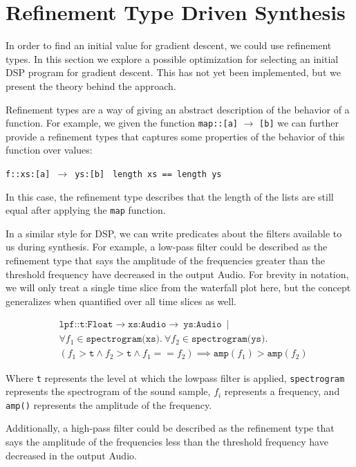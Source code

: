 \section{Refinement Type Driven Synthesis}
\label{sec:rtypes}

In order to find an initial value for gradient descent, we could use refinement types.
In this section we explore a possible optimization for selecting an initial DSP program for gradient descent.
This has not yet been implemented, but we present the theory behind the approach.

Refinement types are a way of giving an abstract description of the behavior of a function. 
For example, we given the function 
%
\texttt{map::[a]} $\to$ \texttt{[b]}
%
we can further provide a refinement types that captures some properties of the behavior of this function over values:

\texttt{f::xs:[a]} $\,\to\,$ \texttt{ys:[b]} \textbar \texttt{ length xs == length ys}

\noindent In this case, the refinement type describes that the length of the lists are still equal after applying the \texttt{map} function.

In a similar style for DSP, we can write predicates about the filters available to us during synthesis. 
For example, a low-pass filter could be described as the refinement type that says the amplitude of the frequencies greater than the threshold frequency have decreased in the output Audio.
For brevity in notation, we will only treat a single time slice from the waterfall plot here, but the concept generalizes when quantified over all time slices as well.

\begin{align*}
  &\texttt{lpf::t:Float} \to  \texttt{xs:Audio} \to\ \texttt{ys:Audio}\ \mid \\
  &\forall f_1 \in  \texttt{spectrogram(xs)}.\ \forall f_2 \in \texttt{spectrogram(ys)}. \\
  &(f_1 > \texttt{t}  \land  f_2 > \texttt{t}  \land f_1 == f_2) \implies \texttt{amp}(f_1) > \texttt{amp}(f_2)
\end{align*}

Where \texttt{t} represents the level at which the lowpass filter is applied, \texttt{spectrogram} represents the spectrogram of the sound sample, $f_i$ represents a frequency, and \texttt{amp()} represents the amplitude of the frequency. 

Additionally, a high-pass filter could be described as the refinement type that says the amplitude of the frequencies less than the threshold frequency have decreased in the output Audio.


